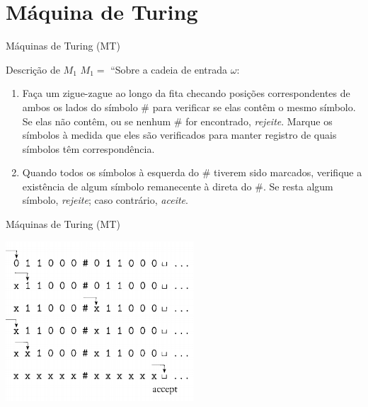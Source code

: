 \documentclass[xcolor=dvipsnames,table]{beamer}
\begin{document}
	
	
	\section{Máquina de Turing}	
    
    \begin{frame}{Máquinas de Turing (MT)}
		\begin{block}{Descrição de $M_1$}
			$M_1 =$ ``Sobre a cadeia de entrada $\omega$:
			\begin{enumerate}
				\item Faça um zigue-zague ao longo da fita checando posições correspondentes de ambos os lados do símbolo $\#$ para verificar se elas contêm o mesmo símbolo. Se elas não contêm, ou se nenhum $\#$ for encontrado, {\it rejeite}. Marque os símbolos à medida que eles são verificados para manter registro de quais símbolos têm correspondência.
				\item Quando todos os símbolos à esquerda do $\#$ tiverem sido marcados, verifique a existência de algum símbolo remanecente à direta do $\#$. Se resta algum símbolo, {\it rejeite}; caso contrário, {\it aceite}.
			\end{enumerate}
		\end{block}
	\end{frame}
	
	\begin{frame}{Máquinas de Turing (MT)}
		\begin{center}
			\includegraphics[height=6cm]{images/fig32.png}
		\end{center}
	\end{frame}	
	
\end{document}
